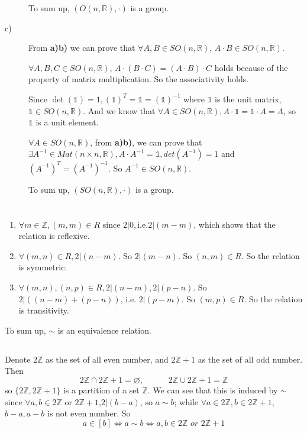 \documentclass[a4paper,12pt,titlepage]{article}
\begin{document}
\begin{description}
To sum up, $(O(n,\mathbb{R}),\cdot)$ is a group.

\item[c)]
From \textbf{a)b)} we can prove that $\forall A,B\in SO(n,\mathbb{R})$, $A\cdot B\in SO(n,\mathbb{R})$.

$\forall A,B,C\in SO(n,\mathbb{R})$, $A\cdot(B\cdot C)=(A\cdot B)\cdot C$ holds because of the property of matrix multiplication. So the associativity holds.

Since $\det(\mathds{1})=1,(\mathds{1})^T=\mathds{1}=(\mathds{1})^{-1}$ where $\mathds{1}$ is the unit matrix, $\mathds{1}\in SO(n,\mathbb{R})$. And we know that $\forall A\in SO(n,\mathbb{R}),A\cdot\mathds{1}=\mathds{1}\cdot A=A$, so $\mathds{1}$ is a unit element.

$\forall A\in SO(n,\mathbb{R})$, from \textbf{a)b)}, we can prove that $\exists A^{-1}\in Mat(n\times n,\mathbb{R}), A\cdot A^{-1}=\mathds{1}, det(A^{-1})=1$ and $(A^{-1})^T=(A^{-1})^{-1}$. So $A^{-1}\in SO(n,\mathbb{R})$.

To sum up, $(SO(n,\mathbb{R}),\cdot)$ is a group.
\end{description}
\section{}
\subsection{}
\begin{enumerate}
\item $\forall m\in\mathbb{Z}, (m,m)\in R$ since $2\big|0, $i.e.$2|(m-m)$, which shows that the relation is reflexive.
\item $\forall (m,n)\in R, 2|(n-m)$. So $2|(m-n)$. So $(n,m)\in R$. So the relation is symmetric.
\item $\forall (m,n),(n,p)\in R, 2|(n-m),2|(p-n)$. So $2|((n-m)+(p-n))$, i.e. $2|(p-m)$. So $(m,p)\in R$.  So the relation is transitivity.
\end{enumerate}

To sum up, $\sim$ is an equivalence relation.
\subsection{}
Denote $2\mathbb{Z}$ as the set of all even number, and 
 $2\mathbb{Z}+1$ as the set of all odd number. Then
 $$2\mathbb{Z}\cap 2\mathbb{Z}+1=\varnothing,\,\,\,\,\,\,\,\,\,\,\,\,\,\,\,\,\,\,2\mathbb{Z}\cup 2\mathbb{Z}+1=\mathbb{Z}$$
so $\lbrace2\mathbb{Z}, 2\mathbb{Z}+1 \rbrace$ is a partition of a set $\mathbb{Z}$. We can see that this is induced by $\sim$ since $\forall a,b\in 2\mathbb{Z}$ or $2\mathbb{Z}+1$,$2|(b-a)$, so $a\sim b$; while $\forall a\in 2\mathbb{Z}, b\in2\mathbb{Z}+1$, $b-a,a-b$ is not even number. So
$$ a\in[b]\Leftrightarrow a\sim b\Leftrightarrow a,b\in 2\mathbb{Z}\,\,or\,\, 2\mathbb{Z}+1$$
 
\end{document}
